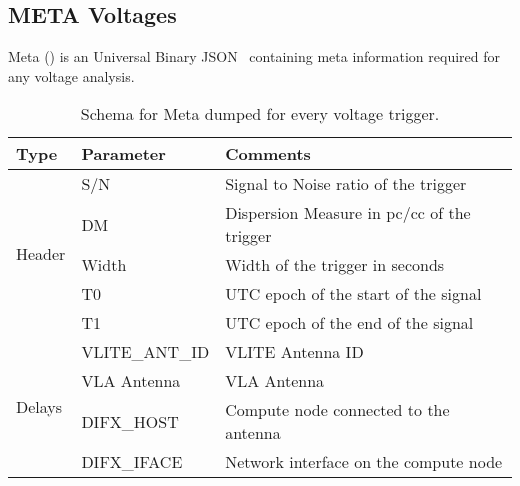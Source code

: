 \subsection {META Voltages}
\label{ssub:metar}
\par Meta (\meta) is an Universal Binary JSON~\cite{ubjson} containing meta information required for any voltage analysis.
\begin{table}[]
	\label{tab:metar}
	\caption{Schema for Meta dumped for every voltage trigger.}
	\begin{tabular}{lll} \toprule
		Type                     & Parameter      & Comments                                                                                                               \\ \midrule
		\multirow{5}{*}{Header}  & S/N            & Signal to Noise ratio of the trigger                                                                                   \\
														 & DM             & Dispersion Measure in pc/cc of the trigger                                                                             \\
														 & Width          & Width of the trigger in seconds                                                                                        \\
														 & T0             & UTC epoch of the start of the signal                                                                                   \\
														 & T1             & UTC epoch of the end of the signal                                                                                     \\
		\multirow{8}{*}{Delays}  & VLITE\_ANT\_ID & VLITE Antenna ID                                                                                                       \\
														 & VLA Antenna    & VLA Antenna                                                                                                            \\
														 & DIFX\_HOST     & Compute node connected to the antenna                                                                                  \\
														 & DIFX\_IFACE    & Network interface on the compute node                                                                                  \\

\end{tabular}
\end{table}
